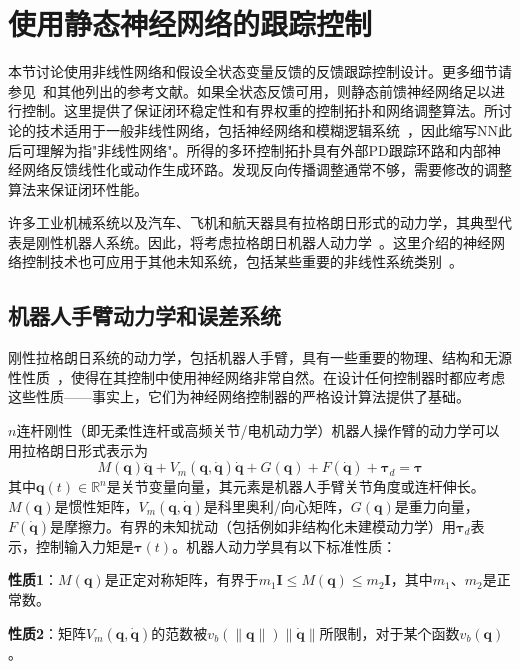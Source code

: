 \documentclass[12pt,a4paper]{ctexart}
\begin{document}
\section{使用静态神经网络的跟踪控制}

本节讨论使用非线性网络和假设全状态变量反馈的反馈跟踪控制设计。更多细节请参见~\cite{lewis1999}和其他列出的参考文献。如果全状态反馈可用，则静态前馈神经网络足以进行控制。这里提供了保证闭环稳定性和有界权重的控制拓扑和网络调整算法。所讨论的技术适用于一般非线性网络，包括神经网络和模糊逻辑系统~\cite{wang1997,lewis1997}，因此缩写NN此后可理解为指"非线性网络"。所得的多环控制拓扑具有外部PD跟踪环路和内部神经网络反馈线性化或动作生成环路。发现反向传播调整通常不够，需要修改的调整算法来保证闭环性能。

许多工业机械系统以及汽车、飞机和航天器具有拉格朗日形式的动力学，其典型代表是刚性机器人系统。因此，将考虑拉格朗日机器人动力学~\cite{lewis1993,lewis1996}。这里介绍的神经网络控制技术也可应用于其他未知系统，包括某些重要的非线性系统类别~\cite{lewis1999}。

\subsection{机器人手臂动力学和误差系统}

刚性拉格朗日系统的动力学，包括机器人手臂，具有一些重要的物理、结构和无源性性质~\cite{craig1988,lewis1993,slotine1988,spong1989}，使得在其控制中使用神经网络非常自然。在设计任何控制器时都应考虑这些性质——事实上，它们为神经网络控制器的严格设计算法提供了基础。

$n$连杆刚性（即无柔性连杆或高频关节/电机动力学）机器人操作臂的动力学可以用拉格朗日形式表示为
\begin{equation}\label{eq:8.3.1}
M(\bm{q})\ddot{\bm{q}} + V_m(\bm{q},\dot{\bm{q}})\dot{\bm{q}} + G(\bm{q}) + F(\dot{\bm{q}}) + \bm{\tau}_d = \bm{\tau}
\end{equation}
其中$\bm{q}(t) \in \mathbb{R}^n$是关节变量向量，其元素是机器人手臂关节角度或连杆伸长。$M(\bm{q})$是惯性矩阵，$V_m(\bm{q},\dot{\bm{q}})$是科里奥利/向心矩阵，$G(\bm{q})$是重力向量，$F(\dot{\bm{q}})$是摩擦力。有界的未知扰动（包括例如非结构化未建模动力学）用$\bm{\tau}_d$表示，控制输入力矩是$\bm{\tau}(t)$。机器人动力学具有以下标准性质：

\textbf{性质1}：$M(\bm{q})$是正定对称矩阵，有界于$m_1\bm{I} \leq M(\bm{q}) \leq m_2\bm{I}$，其中$m_1$、$m_2$是正常数。

\textbf{性质2}：矩阵$V_m(\bm{q},\dot{\bm{q}})$的范数被$v_b(\|\bm{q}\|)\|\dot{\bm{q}}\|$所限制，对于某个函数$v_b(\bm{q})$。
\end{document}
